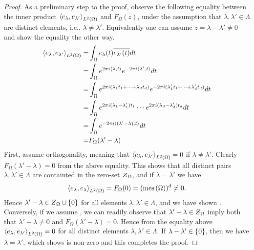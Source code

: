 \documentclass[../thesis.tex]{subfiles}
\begin{document}
\begin{proof}
    As a preliminary step to the proof, observe the following equality between the inner product $\left \langle e_{\lambda},e_{\lambda'}  \right \rangle_{L^2(\Omega)}$ and $F_{\Omega}(z)$, under the assumption that $\lambda,\lambda'\in \Lambda$ are distinct elements, i.e., $\lambda \neq \lambda'$. Equivalently one can assume $z = \lambda - \lambda' \neq0$ and show the equality the other way.  %
    \begin{align*}
        \left \langle e_{\lambda},e_{\lambda'}  \right \rangle_{L^2(\Omega)} =& \int_{\Omega} e_{\lambda}(t)\overline{e_{\lambda'}(t)} dt\\
        =& \int_{\Omega} e^{2\pi i \langle\lambda,t\rangle} e^{-2 \pi i \langle\lambda',t\rangle} dt\\
        =& \int_{\Omega} e^{2\pi i  (\lambda_1t_1 + \dots +\lambda_d t_d)} e^{-2\pi i  (\lambda_1' t_1 + \dots +\lambda_d' t_d)} dt\\
        =& \int_{\Omega} e^{2\pi i  (\lambda_1 -\lambda_1')t_1} \cdots e^{2\pi i  (\lambda_d -\lambda_d')t_d} dt\\
        =&\int_{\Omega} e^{-2 \pi i \langle(\lambda'-\lambda),t\rangle} dt\\
        =& F_{\Omega} (\lambda'-\lambda)
    \end{align*}
    First, assume orthogonality, meaning that $\left \langle e_{\lambda},e_{\lambda'}  \right \rangle_{L^2(\Omega)} = 0 $ if $\lambda \neq\lambda'$. Clearly $F_{\Omega}(\lambda'-\lambda) = 0$ from the above equality. This shows that all distinct pairs $\lambda,\lambda'\in\Lambda$ are containted in the zero-set $\Zstroke_{\Omega}$, and if $\lambda = \lambda'$ we have
    \begin{equation}\label{eq:connection_lamb_equal_lamb}
        \left \langle e_{\lambda},e_{\lambda}  \right \rangle_{L^2(\Omega)} = F_{\Omega}(0) = (\operatorname{mes}\left(\Omega\right))^d \neq 0.
    \end{equation}
    Hence $\lambda'-\lambda \in \Zstroke_{\Omega} \cup \braq{0}$ for all elements $\lambda,\lambda'\in \Lambda$, and we have shown . Conversely, if we assume , we can readily observe that $\lambda'-\lambda \in \Zstroke_{\Omega}$ imply both that $\lambda'-\lambda\neq 0$ and $F_{\Omega} (\lambda'-\lambda) = 0$. Hence from the equality above $\left \langle e_{\lambda},e_{\lambda'}  \right \rangle_{L^2(\Omega)} = 0 $ for all distinct elements $\lambda,\lambda'\in \Lambda$. If $\lambda-\lambda'\in \{0\}$, then we have $\lambda=\lambda'$, which  shows is non-zero and this completes the proof.  %
\end{proof}
\end{document}

